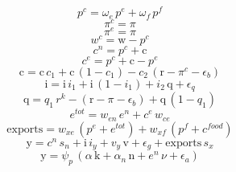 \begin{dmath}
{{p^{c}}}={{\omega_{e}}}\, {{p^{e}}}+{{\omega_{f}}}\, {{p^{f}}}
\end{dmath}
\begin{dmath}
{{\pi^{c}}}={{\pi}}
\end{dmath}
\begin{dmath}
{{\pi^{e}}}={{\pi}}
\end{dmath}
\begin{dmath}
{{w^{c}}}={{\mathrm{w}}}-{{p^{c}}}
\end{dmath}
\begin{dmath}
{{c^{n}}}={{p^{c}}}+{{\mathrm{c}}}
\end{dmath}
\begin{dmath}
{{c^{e}}}={{p^{c}}}+{{\mathrm{c}}}-{{p^{e}}}
\end{dmath}
\begin{dmath}
{{\mathrm{c}}}={{\mathrm{c}}}\, {{c_{1}}}+{{\mathrm{c}}}\, \left(1-{{c_{1}}}\right)-{{c_{2}}}\, \left({{\mathrm{r}}}-{{\pi^{c}}}-{{\epsilon_{b}}}\right)
\end{dmath}
\begin{dmath}
{{\mathrm{i}}}={{\mathrm{i}}}\, {{i_{1}}}+{{\mathrm{i}}}\, \left(1-{{i_{1}}}\right)+{{i_{2}}}\, {{\mathrm{q}}}+{{\epsilon_{q}}}
\end{dmath}
\begin{dmath}
{{\mathrm{q}}}={{q_{1}}}\, {{r^{k}}}-\left({{\mathrm{r}}}-{{\pi}}-{{\epsilon_{b}}}\right)+{{\mathrm{q}}}\, \left(1-{{q_{1}}}\right)
\end{dmath}
\begin{dmath}
{{e^{tot}}}={{w_{en}}}\, {{e^{n}}}+{{c^{e}}}\, {{w_{ce}}}
\end{dmath}
\begin{dmath}
{{\mathrm{exports}}}={{w_{xe}}}\, \left({{p^{e}}}+{{e^{tot}}}\right)+{{w_{xf}}}\, \left({{p^{f}}}+{{c^{food}}}\right)
\end{dmath}
\begin{dmath}
{{\mathrm{y}}}={{c^{n}}}\, {{s_{n}}}+{{\mathrm{i}}}\, {{i_{y}}}+{{v_{y}}}\, {{\mathrm{v}}}+{{\epsilon_{g}}}+{{\mathrm{exports}}}\, {{s_{x}}}
\end{dmath}
\begin{dmath}
{{\mathrm{y}}}={{\psi_{p}}}\, \left({{\alpha}}\, {{\mathrm{k}}}+{{\alpha_{n}}}\, {{\mathrm{n}}}+{{e^{n}}}\, {{\nu}}+{{\epsilon_{a}}}\right)
\end{dmath}
